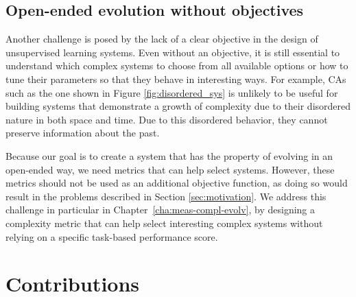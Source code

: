 \subsection{Open-ended evolution without
  objectives}\label{sec:open-ended-evolution}

Another challenge is posed by the lack of a clear objective in the design of
unsupervised learning systems. Even without an objective, it is still essential
to understand which complex systems to choose from all available options or how
to tune their parameters so that they behave in interesting ways. For example,
\acp{CA} such as the one shown in Figure \ref{fig:disordered_sys} is unlikely 
to be useful for building systems that demonstrate a growth of complexity 
due to their disordered nature in both space and time. Due to this disordered behavior, they cannot
preserve information about the past.

Because our goal is to create a system that has the property of evolving in an
open-ended way, we need metrics that can help select systems. However, these metrics 
should not be used as an additional objective function, as doing so would result 
in the problems described in Section \ref{sec:motivation}. We address this 
challenge in particular
in Chapter~\ref{cha:meas-compl-evolv}, by designing a complexity metric that can
help select interesting complex systems without relying on a specific
task-based performance score.

\section{Contributions}

